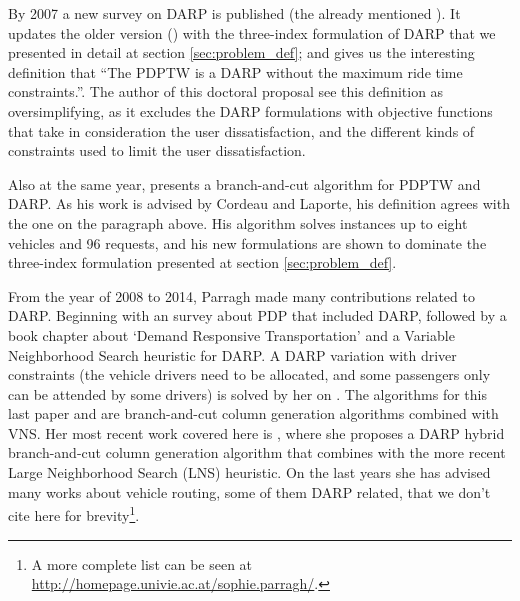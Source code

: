 \documentclass[english,plano-doutorado,twoside]{iiufrgs}
\begin{document}
By 2007 a new survey on DARP is published (the already mentioned \cite{cordeau_dial_ride_2007}). It updates the older version (\cite{cordeau_survey_2002}) with the three-index formulation of DARP that we presented in detail at section \ref{sec:problem_def}; and gives us the interesting definition that ``The PDPTW is a DARP without the maximum ride time constraints.''. The author of this doctoral proposal see this definition as oversimplifying, as it excludes the DARP formulations with objective functions that take in consideration the user dissatisfaction, and the different kinds of constraints used to limit the user dissatisfaction.%

Also at the same year, \cite{ropke_models_2007} presents a branch-and-cut algorithm for PDPTW and DARP. As his work is advised by Cordeau and Laporte, his definition agrees with the one on the paragraph above. His algorithm solves instances up to eight vehicles and 96 requests, and his new formulations are shown to dominate the three-index formulation presented at section \ref{sec:problem_def}.


From the year of 2008 to 2014, Parragh made many contributions related to DARP. Beginning with an survey about PDP that included DARP\cite{parragh_survey_2008}, followed by a book chapter about `Demand Responsive Transportation'\cite{parragh_demand_2010} and a Variable Neighborhood Search heuristic for DARP\cite{parragh_variable_2010}. A DARP variation with driver constraints (the vehicle drivers need to be allocated, and some passengers only can be attended by some drivers) is solved by her on \cite{parragh_models_2010}. The algorithms for this last paper and \cite{parragh_introducing_2011} are branch-and-cut column generation algorithms combined with VNS. Her most recent work covered here is \cite{parragh_hybrid_2013}, where she proposes a DARP hybrid branch-and-cut column generation algorithm that combines with the more recent Large Neighborhood Search (LNS) heuristic. On the last years she has advised many works about vehicle routing, some of them DARP related, that we don't cite here for brevity\footnote{A more complete list can be seen at \url{http://homepage.univie.ac.at/sophie.parragh/}.}.
\end{document}
